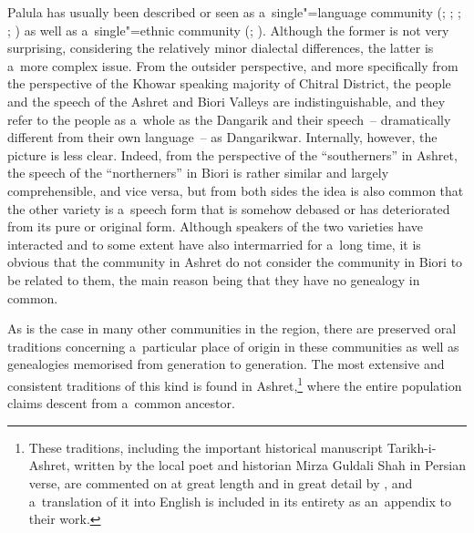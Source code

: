 Palula has usually been described or seen as a~single"=language community (\citealt[7]{morgenstierne1941}; \citealt[67]{decker1992a}; \citeyear[160]{decker1996}; \citealt[21]{masica1991}; \citealt[253, 258]{strand2001}) as well as a~single"=ethnic community (\citealt[79--143]{cacopardo2001}; \citealt[5]{akhunzadaliljegren2009}). Although the former is not very surprising, considering the relatively minor dialectal differences, the latter is a~more complex issue. From the outsider perspective, and more specifically from the perspective of the Khowar speaking majority of Chitral District, the people and the speech of the Ashret and Biori Valleys are indistinguishable, and they refer to the people as a~whole as the Dangarik and their speech~-- dramatically different from their own language~-- as Dangarikwar. Internally, however, the picture is less clear. Indeed, from the perspective of the ``southerners'' in Ashret, the speech of the ``northerners'' in Biori is rather similar and largely comprehensible, and vice versa, but from both sides the idea is also common that the other variety is a~speech form that is somehow debased or has deteriorated from its pure or original form. Although speakers of the two varieties have interacted and to some extent have also intermarried for a~long time, it is obvious that the community in Ashret do not consider the community in Biori to be related to them, the main reason being that they have no genealogy in common. 


As is the case in many other communities in the region, there are preserved oral traditions concerning a~particular place of origin in these communities as well as genealogies memorised from generation to generation. The most extensive and consistent traditions of this kind is found in Ashret,\footnote{These traditions, including the important historical manuscript Tarikh-i-Ashret, written by the local poet and historian Mirza Guldali Shah in Persian verse, are commented on at great length and in great detail by \citet[79--143]{cacopardo2001}, and a~translation of it into English is included in its entirety as an~appendix to their work.} where the entire population claims descent from a~common ancestor. 


